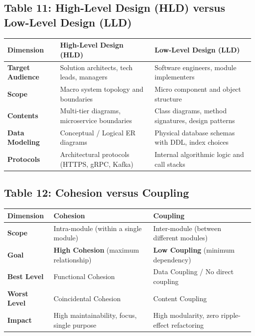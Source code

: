 \subsection*{Table 11: High-Level Design (HLD) versus Low-Level Design (LLD)}
\begin{center}
\small
\begin{tabularx}{\textwidth}{lXX}
\toprule
\textbf{Dimension} & \textbf{High-Level Design (HLD)} & \textbf{Low-Level Design (LLD)} \\
\midrule
\textbf{Target Audience} & Solution architects, tech leads, managers & Software engineers, module implementers \\
\textbf{Scope} & Macro system topology and boundaries & Micro component and object structure \\
\textbf{Contents} & Multi-tier diagrams, microservice boundaries & Class diagrams, method signatures, design patterns \\
\textbf{Data Modeling} & Conceptual / Logical ER diagrams & Physical database schemas with DDL, index choices \\
\textbf{Protocols} & Architectural protocols (HTTPS, gRPC, Kafka) & Internal algorithmic logic and call stacks \\
\bottomrule
\end{tabularx}
\end{center}

\subsection*{Table 12: Cohesion versus Coupling}
\begin{center}
\small
\begin{tabularx}{\textwidth}{lXX}
\toprule
\textbf{Dimension} & \textbf{Cohesion} & \textbf{Coupling} \\
\midrule
\textbf{Scope} & Intra-module (within a single module) & Inter-module (between different modules) \\
\textbf{Goal} & \textbf{High Cohesion} (maximum relationship) & \textbf{Low Coupling} (minimum dependency) \\
\textbf{Best Level} & Functional Cohesion & Data Coupling / No direct coupling \\
\textbf{Worst Level} & Coincidental Cohesion & Content Coupling \\
\textbf{Impact} & High maintainability, focus, single purpose & High modularity, zero ripple-effect refactoring \\
\bottomrule
\end{tabularx}
\end{center}

